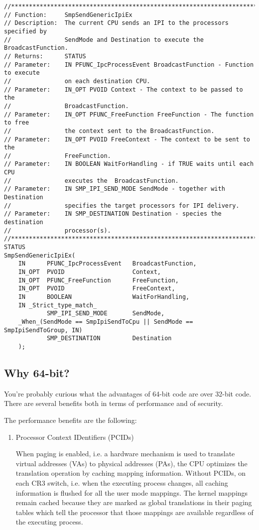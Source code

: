 \begin{appendices}
\begin{lstlisting}[caption={IPI functions},label={lst:SmpIpi}]
//******************************************************************************
// Function:     SmpSendGenericIpiEx
// Description:  The current CPU sends an IPI to the processors specified by
//               SendMode and Destination to execute the BroadcastFunction.
// Returns:      STATUS
// Parameter:    IN PFUNC_IpcProcessEvent BroadcastFunction - Function to execute
//               on each destination CPU.
// Parameter:    IN_OPT PVOID Context - The context to be passed to the
//               BroadcastFunction.
// Parameter:    IN_OPT PFUNC_FreeFunction FreeFunction - The function to free
//               the context sent to the BroadcastFunction.
// Parameter:    IN_OPT PVOID FreeContext - The context to be sent to the
//               FreeFunction.
// Parameter:    IN BOOLEAN WaitForHandling - if TRUE waits until each CPU
//               executes the  BroadcastFunction.
// Parameter:    IN SMP_IPI_SEND_MODE SendMode - together with Destination
//               specifies the target processors for IPI delivery.
// Parameter:    IN SMP_DESTINATION Destination - species the destination
//               processor(s).
//******************************************************************************
STATUS
SmpSendGenericIpiEx(
    IN      PFUNC_IpcProcessEvent   BroadcastFunction,
    IN_OPT  PVOID                   Context,
    IN_OPT  PFUNC_FreeFunction      FreeFunction,
    IN_OPT  PVOID                   FreeContext,
    IN      BOOLEAN                 WaitForHandling,
    IN _Strict_type_match_
            SMP_IPI_SEND_MODE       SendMode,
    _When_(SendMode == SmpIpiSendToCpu || SendMode == SmpIpiSendToGroup, IN)
            SMP_DESTINATION         Destination
    );
\end{lstlisting}

\subsection{Why 64-bit?}
\label{sect:Why64}

You're probably curious what the advantages of 64-bit code are over 32-bit code. There are several
benefits both in terms of performance and of security.

The performance benefits are the following:
\begin{enumerate}
	\item Processor Context IDentifiers (PCIDs)

	When paging is enabled, i.e. a hardware mechanism is used to translate virtual addresses (VAs)
to physical addresses (PAs), the CPU optimizes the translation operation by caching mapping
information. Without PCIDs, on each CR3 switch, i.e. when the executing process changes, all
caching information is flushed for all the user mode mappings. The kernel mappings remain cached
because they are marked as global translations in their paging tables which tell the processor that
those mappings are available regardless of the executing process.


\end{enumerate}
\end{appendices}
